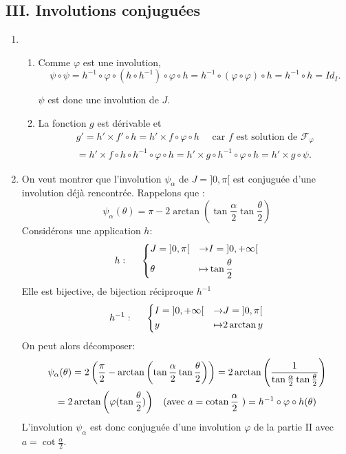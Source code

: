 \subsection*{III. Involutions conjuguées}
\begin{enumerate}
\item
\begin{enumerate}
\item Comme $\varphi$ est une involution,   
\[
\psi\circ\psi=h^{-1}\circ \varphi\circ( h\circ h^{-1})\circ \varphi\circ h=h^{-1}\circ (\varphi\circ \varphi)\circ h=h^{-1}\circ h=Id_I.  
\]

$\psi$ est donc une involution de $J$.
\item La fonction $g$ est dérivable et 
\begin{multline*}
g'= h'\times f'\circ h
= h'\times f\circ \varphi\circ h\quad \text{ car $f$ est solution de } \mathcal F_\varphi \\
= h'\times f\circ h\circ h^{-1}\circ \varphi\circ h
= h'\times  g\circ h^{-1}\circ \varphi\circ h
= h'\times  g\circ\psi .
\end{multline*}
\end{enumerate}

\item On veut montrer que l'involution $\psi_\alpha$ de $J=]0,\pi[$ est conjuguée d'une involution déjà rencontrée. Rappelons que :
\begin{displaymath}
\psi_{\alpha}(\theta) = \pi -2\arctan\left(\tan\frac{\alpha}{2}\tan\frac{\theta}{2} \right)
\end{displaymath}
Considérons une application $h$:
\begin{displaymath}
  h:\hspace{0.5cm}
\left\lbrace 
\begin{aligned}
  &J = \left]0,\pi \right[ &\rightarrow& I = \left]0,+\infty \right[ \\
  &\theta &\mapsto& \tan \frac{\theta}{2}
\end{aligned}
\right. 
\end{displaymath}
Elle est bijective, de bijection réciproque $h^{-1}$
\begin{displaymath}
  h^{-1}:\hspace{0.5cm}
\left\lbrace 
\begin{aligned}
  &I = \left]0,+\infty \right[ &\rightarrow&  J = \left]0,\pi \right[ \\
  &y &\mapsto& 2\arctan y
\end{aligned}
\right. 
\end{displaymath}
On peut alors décomposer:
\begin{multline*}
\psi_\alpha(\theta) = 2\left( \frac{\pi}{2}-\arctan\left(\tan\frac{\alpha}{2}\tan \frac{\theta}{2} \right) \right) 
= 2\arctan\left( \frac{1}{\tan\frac{\alpha}{2}\tan \frac{\theta}{2}} \right) \\
= 2\arctan\left(\varphi(\tan \frac{\theta}{2})\right)\hspace{0.2cm}\text{ (avec $a =\cot\frac{\alpha}{2}$ )}  
= h^{-1}\circ \varphi \circ h(\theta)
\end{multline*}
L'involution $\psi_\alpha$ est donc conjuguée d'une involution $\varphi$ de la partie II avec $a =\cot\frac{\alpha}{2}$.


\end{enumerate}
